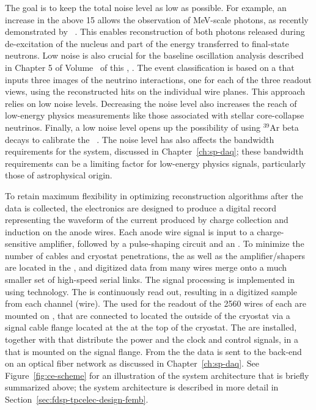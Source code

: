 The goal is to keep the total noise level as low as possible. For example, an 
increase in the  above 15 allows the observation of MeV-scale photons, 
as recently demonstrated by ~\cite{Acciarri:2018myr}. This enables  
reconstruction of both photons released during de-excitation of the nucleus and %
part
of the energy transferred to final-state neutrons. Low noise is also crucial
for the baseline oscillation analysis described in Chapter 5 of Volume~\volnumberphysics{} of this
, \voltitlephysics{}. %
The event classification is based
on %
a  that %
inputs three images
of the neutrino interactions, one for each of the three readout views, using the
reconstructed hits on the individual wire planes. This approach relies
on  low noise levels.
Decreasing the noise level also increases the reach of low-energy 
physics measurements like those associated with stellar core-collapse  neutrinos. Finally, a low noise level opens up the possibility of using 
$\mathrm{{}^{39}Ar}$ beta decays to calibrate the 
~\cite{MICROBOONE-NOTE-1050-PUB}.
The noise level has also affects %
the bandwidth requirements
for the  system, %
discussed in Chapter~\ref{ch:sp-daq}; 
these bandwidth requirements can be a limiting factor for low-energy
physics signals, particularly those of astrophysical origin.

To retain maximum flexibility in optimizing reconstruction algorithms after 
the  data is collected, the  electronics are designed 
to produce a digital record representing the waveform of the current produced 
by charge collection and induction on the anode wires.  Each anode wire signal is 
input to a charge-sensitive amplifier, followed by a pulse-shaping circuit and 
an .  To minimize the number of cables and cryostat penetrations, 
the  as well as the amplifier/shapers are located in the , 
and digitized data from many wires merge onto a much smaller set of high-speed 
serial links. The  signal processing is implemented in 
using  technology.  The  is continuously 
read out, resulting in a digitized  sample from each  
channel (wire). The  used for the readout of the \num{2560}
wires of each  are mounted on , that are connected to
 located the outside of the cryostat via a  signal 
cable flange located at the  \fdth at the top of the cryostat.
The  are installed, together with  that distribute
the power and the clock and control signals, in a  that is
mounted on the signal flange. From the  the data is sent to 
the  back-end on an optical fiber network as discussed in 
Chapter~\ref{ch:sp-daq}. See Figure~\ref{fig:ce-scheme} for an illustration of
the  system architecture that is briefly summarized above; the 
system architecture is described in more detail in
Section~\ref{sec:fdsp-tpcelec-design-femb}.

